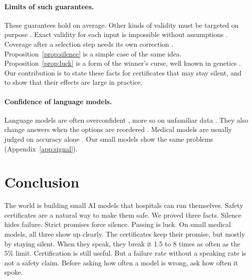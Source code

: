 \documentclass[11pt]{article}
\theoremstyle{plain}
\theoremstyle{definition}
\begin{document}
\paragraph{Limits of such guarantees.} These guarantees hold on average. Other kinds of validity must be targeted on purpose \citep{vovk2012conditional}. Exact validity for each input is impossible without assumptions \citep{barber2021limits}. Coverage after a selection step needs its own correction \citep{jin2023selection,bao2024selective}. Proposition~\ref{prop:silence} is a simple case of the same idea. Proposition~\ref{prop:luck} is a form of the winner's curse, well known in genetics \citep{zollner2007overcoming}. Our contribution is to state these facts for certificates that may stay silent, and to show that their effects are large in practice.

\paragraph{Confidence of language models.} Language models are often overconfident \citep{guo2017calibration,desai2020calibration,kadavath2022know}, more so on unfamiliar data \citep{ovadia2019trust}. They also change answers when the options are reordered \citep{zheng2024selectors}. Medical models are usually judged on accuracy alone \citep{singhal2023medpalm}. Our small models show the same problems (Appendix~\ref{app:signal}).

\section{Conclusion}

The world is building small AI models that hospitals can run themselves. Safety certificates are a natural way to make them safe. We proved three facts. Silence hides failure. Strict promises force silence. Passing is luck. On small medical models, all three show up clearly. The certificates keep their promise, but mostly by staying silent. When they speak, they break it 1.5 to 8 times as often as the 5\% limit. Certification is still useful. But a failure rate without a speaking rate is not a safety claim. Before asking how often a model is wrong, ask how often it spoke.

\FloatBarrier



\appendix
\clearpage
\end{document}
